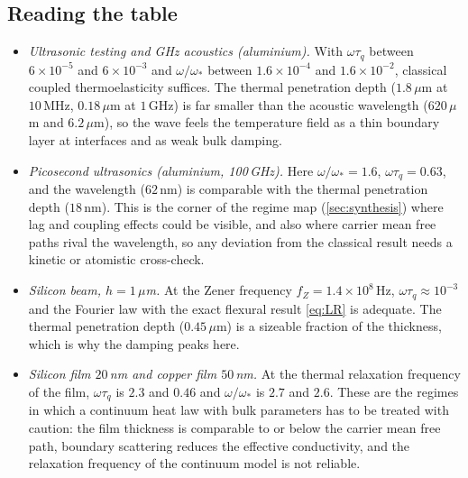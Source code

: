 \subsection{Reading the table}
\begin{itemize}
\item \emph{Ultrasonic testing and GHz acoustics (aluminium).} With $\omega\tau_q$ between $6\times10^{-5}$ and $6\times10^{-3}$ and $\omega/\omega_*$ between $1.6\times10^{-4}$ and $1.6\times10^{-2}$, classical coupled thermoelasticity suffices. The thermal penetration depth ($1.8\,\mu$m at $10$\,MHz, $0.18\,\mu$m at $1$\,GHz) is far smaller than the acoustic wavelength ($620\,\mu$m and $6.2\,\mu$m), so the wave feels the temperature field as a thin boundary layer at interfaces and as weak bulk damping.
\item \emph{Picosecond ultrasonics (aluminium, 100\,GHz).} Here $\omega/\omega_*=1.6$, $\omega\tau_q=0.63$, and the wavelength ($62$\,nm) is comparable with the thermal penetration depth ($18$\,nm). This is the corner of the regime map (\cref{sec:synthesis}) where lag and coupling effects could be visible, and also where carrier mean free paths rival the wavelength, so any deviation from the classical result needs a kinetic or atomistic cross-check.
\item \emph{Silicon beam, $h=1\,\mu$m.} At the Zener frequency $f_Z=1.4\times10^{8}$\,Hz, $\omega\tau_q\approx10^{-3}$ and the Fourier law with the exact flexural result \cref{eq:LR} is adequate. The thermal penetration depth ($0.45\,\mu$m) is a sizeable fraction of the thickness, which is why the damping peaks here.
\item \emph{Silicon film $20$\,nm and copper film $50$\,nm.} At the thermal relaxation frequency of the film, $\omega\tau_q$ is $2.3$ and $0.46$ and $\omega/\omega_*$ is $2.7$ and $2.6$. These are the regimes in which a continuum heat law with bulk parameters has to be treated with caution: the film thickness is comparable to or below the carrier mean free path, boundary scattering reduces the effective conductivity, and the relaxation frequency of the continuum model is not reliable.
\end{itemize}

